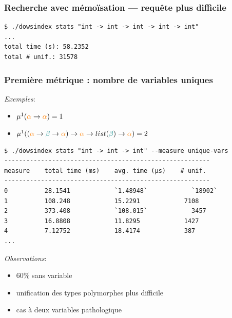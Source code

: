 \documentclass[serif]{beamer}
\newcommand{\exemples}{\textit{Exemples}\xspace}
\newcommand{\observations}{\textit{Observations}\xspace}
\begin{document}

\begin{frame}[fragile=singleslide]\frametitle{Recherche avec mémoïsation — requête plus difficile}
\begin{verbatim}
$ ./dowsindex stats "int -> int -> int -> int -> int"
...
total time (s): 58.2352
total # unif.: 31578
\end{verbatim}
\end{frame}


\begin{frame}[fragile=singleslide]\frametitle{Première métrique : nombre de variables uniques}
\scriptsize
\exemples :
\begin{itemize}
	\item $\mu^1 (\textcolor{orange}{\alpha} \rightarrow \textcolor{orange}{\alpha}) = 1$
	\item $\mu^1 ((\textcolor{orange}{\alpha} \rightarrow \textcolor{teal}{\beta} \rightarrow \textcolor{orange}{\alpha}) \rightarrow \textcolor{orange}{\alpha} \rightarrow list (\textcolor{teal}{\beta}) \rightarrow \textcolor{orange}{\alpha}) = 2$
\end{itemize}
\bigskip
\begin{lstlisting}
$ ./dowsindex stats "int -> int -> int" --measure unique-vars
--------------------------------------------------------
measure    total time (ms)    avg. time (µs)    # unif.
--------------------------------------------------------
0          28.1541            `1.48948`            `18902`
1          108.248            15.2291            7108
2          373.408            `108.015`            3457
3          16.8808            11.8295            1427
4          7.12752            18.4174            387
...
\end{lstlisting}
\observations :
\begin{itemize}
	\item 60\% sans variable
	\item unification des types polymorphes plus difficile
	\item cas à deux variables pathologique
\end{itemize}
\end{frame}

\end{document}
